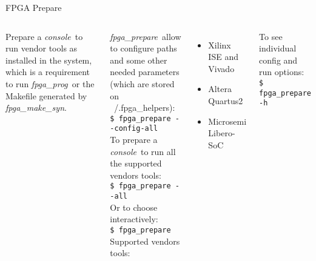 \documentclass{beamer}
\newcommand{\fpgaprepare}    {\textit{fpga\_prepare}}
\newcommand{\fpgamakesyn}    {\textit{fpga\_make\_syn}}
\newcommand{\fpgaprog}       {\textit{fpga\_prog}}
\newcommand{\console}        {\textit{console}}
\newcommand{\shellcmd}[1]{\\\indent\indent\texttt{\scriptsize #1}\\}
\begin{document}
\begin{frame}{FPGA Prepare}
  \begin{columns}
      \begin{exampleblock}{}
        Prepare a \console\ to run vendor tools as installed in the system,
        which is a requirement to run \fpgaprog\ or the Makefile generated by \fpgamakesyn.
      \end{exampleblock}
      \fpgaprepare\ allow to configure paths and some other needed parameters (which are
      stored on ~/.fpga\_helpers):
      \shellcmd{\$ fpga\_prepare -{}-config-all}
      To prepare a \console\ to run all the supported vendors tools:
      \shellcmd{\$ fpga\_prepare -{}-all}
      Or to choose interactively:
      \shellcmd{\$ fpga\_prepare}
      Supported vendors tools:
      \begin{itemize}
        \item Xilinx ISE and Vivado
        \item Altera Quartus2
        \item Microsemi Libero-SoC
      \end{itemize}
      To see individual config and run options:
      \shellcmd{\$ fpga\_prepare -h}
  \end{columns}
\end{frame}

\end{document}
